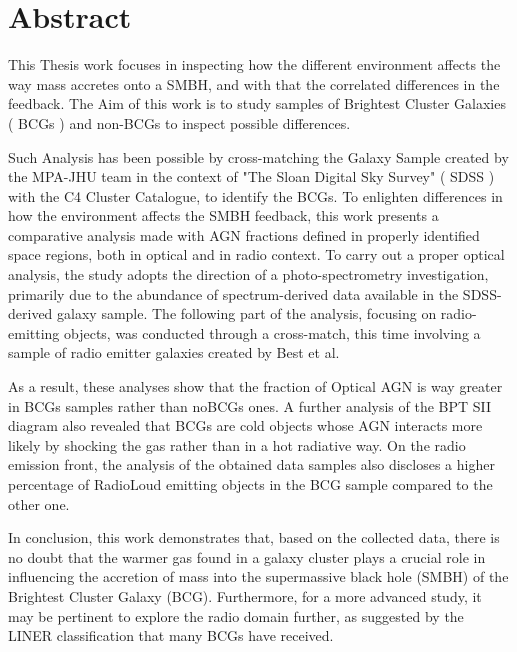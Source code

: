 \chapter*{Abstract}
This Thesis work focuses in inspecting how the different environment affects the way mass accretes onto a SMBH, and with that the correlated differences in the feedback.
The Aim of this work is to study samples of Brightest Cluster Galaxies ( BCGs ) and non-BCGs to inspect possible differences.

Such Analysis has been possible by cross-matching the Galaxy Sample created by the MPA-JHU team in the context of  "The Sloan Digital Sky Survey" ( SDSS ) with the C4 Cluster Catalogue, to identify the BCGs.  %
To enlighten differences in how the environment affects the SMBH feedback, this work presents a comparative analysis made with AGN fractions defined in properly identified space regions, both in optical and in radio context.
To carry out a proper optical analysis, the study adopts the direction of a photo-spectrometry investigation, primarily due to the abundance of spectrum-derived data available in the SDSS-derived galaxy sample.
The following part of the analysis, focusing on radio-emitting objects, was conducted through a cross-match, this time involving a sample of radio emitter galaxies created by Best et al.

As a result, these analyses show that the fraction of Optical AGN is way greater in BCGs samples rather than noBCGs ones.
A further analysis of the BPT SII diagram also revealed that BCGs are cold objects whose AGN interacts more likely by shocking the gas rather than in a hot radiative way.
On the radio emission front, the analysis of the obtained data samples also discloses a higher percentage of RadioLoud emitting objects in the BCG sample compared to the other one.

In conclusion, this work demonstrates that, based on the collected data, there is no doubt that the warmer gas found in a galaxy cluster plays a crucial role in influencing the accretion of mass into the supermassive black hole (SMBH) of the Brightest Cluster Galaxy (BCG). Furthermore, for a more advanced study, it may be pertinent to explore the radio domain further, as suggested by the LINER classification that many BCGs have received.